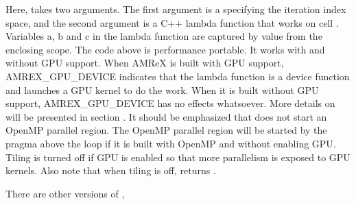 \documentclass[letterpaper,10pt,english]{sphinxmanual}
\begin{document}
\sphinxAtStartPar
Here,  takes two arguments.  The first argument is a
 specifying the iteration index space, and the second
argument is a C++ lambda function that works on cell .
Variables a, b and c in the lambda function are captured by value from
the enclosing scope.  The code above is performance portable.  It
works with and without GPU support.  When AMReX is built with GPU support,
AMREX\_GPU\_DEVICE indicates that the lambda function is a device
function and  launches a GPU kernel to do the work.
When it is built without GPU support, AMREX\_GPU\_DEVICE has no effects
whatsoever.  More details on  will be presented in
section {\hyperref[\detokenize{GPU:sec-gpu-for}]{}}.  It should be emphasized that
 does not start an OpenMP parallel region.  The OpenMP parallel
region will be started by the pragma above the  loop if it is
built with OpenMP and without enabling GPU.  Tiling is turned off if
GPU is enabled so that more parallelism is exposed to GPU kernels.
Also note that when tiling is off,  returns
.

\sphinxAtStartPar
There are other versions of ,

\begin{sphinxVerbatim}[commandchars=\\\{\}]
 \PYG{p}{[}\PYG{p}{]}      

 
            \PYG{p}{[}\PYG{p}{]}            
\end{sphinxVerbatim}
\end{document}
